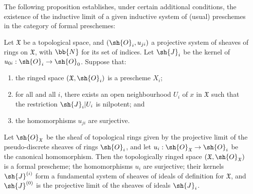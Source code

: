 The following proposition establishes, under certain additional conditions, the existence of the inductive limit of a given inductive system of (usual) preschemes in the category of formal preschemes:
\begin{proposition}[10.6.3]
\label{I.10.6.3}
Let $\mathfrak{X}$ be a topological space, and $(\sh{O}_i,u_{ji})$ a projective system of sheaves of rings on $\mathfrak{X}$, with $\bb{N}$ for its set of indices.
Let $\sh{J}_i$ be the kernel of $u_{0i}:\sh{O}_i\to\sh{O}_0$.
Suppose that:
\begin{enumerate}
  \item[\rm{(a)}] the ringed space $(\mathfrak{X},\sh{O}_i)$ is a prescheme $X_i$;
  \item[\rm{(b)}] for all  and all $i$, there exists an open neighbourhood $U_i$ of $x$ in $\mathfrak{X}$ such that the restriction $\sh{J}_i|U_i$ is nilpotent; and
  \item[\rm{(c)}] the homomorphisms $u_{ji}$ are surjective.
\end{enumerate}

Let $\sh{O}_\mathfrak{X}$ be the sheaf of topological rings given by the projective limit of the pseudo-discrete sheaves of rings $\sh{O}_i$, and let $u_i:\sh{O}_\mathfrak{X}\to\sh{O}_i$ be the canonical homomorphism.
Then the topologically ringed space $(\mathfrak{X},\sh{O}_\mathfrak{X})$ is a formal prescheme; the homomorphisms $u_i$ are surjective; their kernels $\sh{J}^{(i)}$ form a fundamental system of sheaves of ideals of definition for $\mathfrak{X}$, and $\sh{J}^{(0)}$ is the projective limit of the sheaves of ideals $\sh{J}_i$.
\end{proposition}

